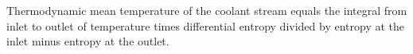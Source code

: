 Thermodynamic mean temperature of the coolant stream equals the integral from inlet to outlet of temperature times differential entropy divided by entropy at the inlet minus entropy at the outlet.